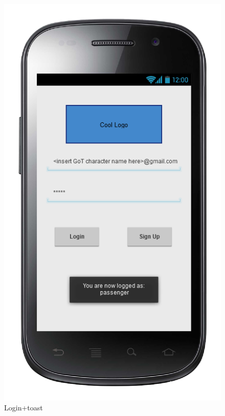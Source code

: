 \begin{center}
\begin{figure} [h]
  	  \includegraphics[scale=0.5]{ui/Login + toast.png}
\caption{Login+toast}
    
	\end{figure}
\end{center}

